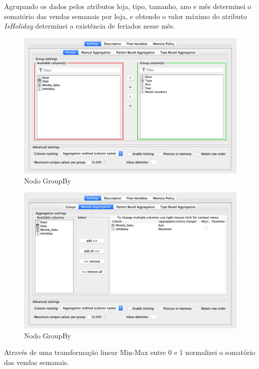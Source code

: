 \clearpage

Agrupando os dados pelos atributos loja, tipo, tamanho, ano e mês determinei o somatório das vendas semanais por loja, e obtendo o valor máximo do atributo \textit{IsHoliday} determinei a existência de feriados nesse mês. 

\begin{figure}[H]
    \centering
    \includegraphics[scale=0.3]{Images/T2_c1.png}
    \caption{Nodo GroupBy}
\end{figure}

\begin{figure}[H]
    \centering
    \includegraphics[scale=0.3]{Images/T2_c2.png}
    \caption{Nodo GroupBy}
\end{figure}

\clearpage

Através de uma transformação linear Min-Max entre 0 e 1 normalizei o somatório das vendas semanais.

